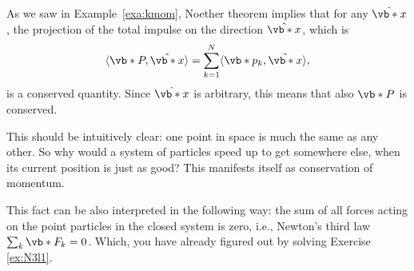 \documentclass[english,fontsize=11pt,paper=b5]{scrbook}
\numberwithin{equation}{chapter}
\theoremstyle{definition}
\begin{document}
    As we saw in Example~\ref{exa:kmom}, Noether theorem implies that for any $\hat{\vb*{x}}$, the projection of the total impulse on the direction $\hat{\vb*{x}}$, which is
    \begin{equation}
      \langle\vb*{P}, \hat{\vb*{x}}\rangle = \sum_{k=1}^N \langle \vb*{p}_k, \hat{\vb*{x}}\rangle,
    \end{equation}
    is a conserved quantity.
    Since $\hat{\vb*{x}}$ is arbitrary, this means that also $\vb*{P}$ is conserved.

    This should be intuitively clear: one point in space is much the same as any other. So why would a system of particles speed up to get somewhere else, when its current position is just as good? This manifests itself as conservation of momentum.

    This fact can be also interpreted in the following way: the sum of all forces acting on the point particles in the closed system is zero, i.e., Newton's third law $\sum_k \vb*{F}_k = 0$. Which, you have already figured out by solving Exercise \ref{ex:N3l1}.
\end{document}
